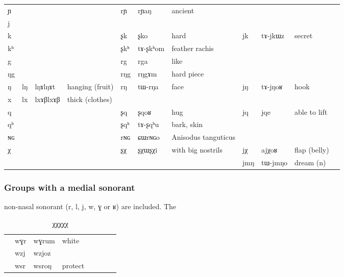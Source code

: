 \documentclass[oldfontcommands,oneside,a4paper,11pt]{article}
\newcommand{\ipa}[1]{{\phon #1}} %
\newcommand{\idph}[1]{\cellcolor{gray}\textbf{#1}}
\begin{document}
\begin{table}
{\begin{tabular}{l|lll|lll|lll|l}
\ipa{ɲ}   &	  &	  &	&	\ipa{rɲ}  &	\ipa{rɲaŋ}  &	ancient&	  &	  &	&	\\
\ipa{j}   &	  &	  &	&	  &	  &	&	  &	  &	&	\\
\ipa{k}   &	  &	  &	&	\ipa{ʂk}  &	\ipa{ʂko}  &	hard&	\ipa{jk}  &	\ipa{tɤ-jkɯz}  &secret	&	\\
\ipa{kʰ}   &	  &	  &	&	\ipa{ʂkʰ}  &	\ipa{tɤ-ʂkʰom}  &	feather rachis&	   &	  &	&	\\
\ipa{g}   &	  &	  &	&	\ipa{rg}  &	\ipa{rga}  &	like&	  &	  &	&	\\
\ipa{ŋg}   &	  &	  &	&	\ipa{rŋg}  &	\ipa{rŋgɤm}  &hard piece	&	   &	   &	&	\\
\ipa{ŋ}   &	\ipa{lŋ}  \idph{} &	\ipa{lŋɤlŋɤt}  &hanging (fruit)	&	\ipa{rŋ}  &	\ipa{tɯ-rŋa}  &	face&	\ipa{jŋ}  &	\ipa{tɤ-jŋoʁ}  &	hook&	\\
\ipa{x}   &	\ipa{lx}  \idph{} &	\ipa{lxɤβlxɤβ}  &thick (clothes)	&	  &	  &	&	  &	  &	&	\\
\ipa{q}   &	  &	  &	&	\ipa{ʂq}  &	\ipa{ʂqoʁ}  &hug	&	\ipa{jq}  &	\ipa{jqe}  &	able to lift&	\\
\ipa{qʰ}   &	  &	  &	&	\ipa{ʂqʰ}  &	\ipa{tɤ-ʂqʰu}  &bark, skin&	   &	   &	&	\\
\ipa{ɴɢ}   &	  &	  &	&	\ipa{rɴɢ}  &	\ipa{ɕɯrɴɢo}  &Anisodus tanguticus 	&	  &	  &	&	\\
\ipa{χ}   &	  &	  &	&	\ipa{ʂχ}   &	\ipa{ʂχɯʂχi}  &with big nostrils	&	\ipa{jχ}  &	\ipa{ajχoʁ}  &	flap (belly)&	\\
\midrule
&&&&&&&\ipa{jmŋ} & \ipa{tɯ-jmŋo} &dream (n)\\
\bottomrule
\end{tabular}}
\end{table}
 
 
 
 \subsubsection{Groups with a medial sonorant } \label{sec:medial}
  non-nasal sonorant (\ipa{r}, \ipa{l}, \ipa{j}, \ipa{w}, \ipa{ɣ} or \ipa{ʁ}) are included. The
  
 \begin{table}
 \caption{χχχχχ}
\begin{tabular}{llllllll}
&	\ipa{wɣr}  &	\ipa{wɣrum}  &white	\\
&	\ipa{wzj}  &	\ipa{wzjoz}  &	\\
  &	\ipa{wsr}  &	\ipa{wsroŋ}  &protect	\\
\end{tabular}


  \end{table} 
  
\end{document}
